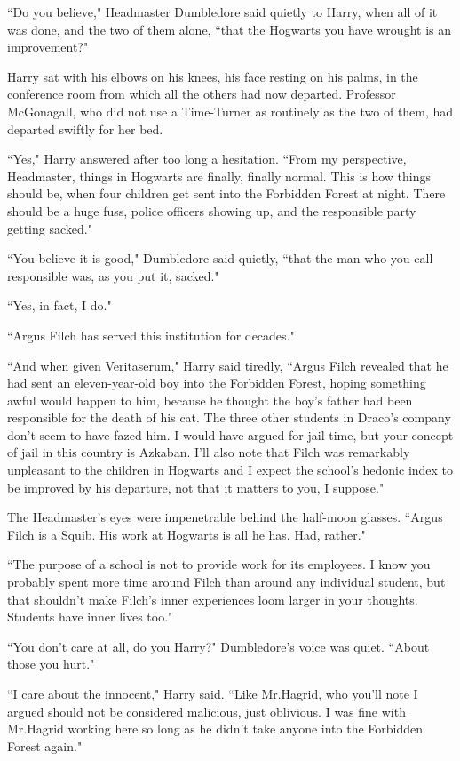 ``Do you believe," Headmaster Dumbledore said quietly to Harry, when all of it was done, and the two of them alone, ``that the Hogwarts you have wrought is an improvement?"

Harry sat with his elbows on his knees, his face resting on his palms, in the conference room from which all the others had now departed. Professor McGonagall, who did not use a Time-Turner as routinely as the two of them, had departed swiftly for her bed.

``Yes," Harry answered after too long a hesitation. ``From my perspective, Headmaster, things in Hogwarts are finally, finally normal. This is how things should be, when four children get sent into the Forbidden Forest at night. There should be a huge fuss, police officers showing up, and the responsible party getting sacked."

``You believe it is good," Dumbledore said quietly, ``that the man who you call responsible was, as you put it, sacked."

``Yes, in fact, I do."

``Argus Filch has served this institution for decades."

``And when given Veritaserum," Harry said tiredly, ``Argus Filch revealed that he had sent an eleven-year-old boy into the Forbidden Forest, hoping something awful would happen to him, because he thought the boy's father had been responsible for the death of his cat. The three other students in Draco's company don't seem to have fazed him. I would have argued for jail time, but your concept of jail in this country is Azkaban. I'll also note that Filch was remarkably unpleasant to the children in Hogwarts and I expect the school's hedonic index to be improved by his departure, not that it matters to you, I suppose."

The Headmaster's eyes were impenetrable behind the half-moon glasses. ``Argus Filch is a Squib. His work at Hogwarts is all he has. Had, rather."

``The purpose of a school is not to provide work for its employees. I know you probably spent more time around Filch than around any individual student, but that shouldn't make Filch's inner experiences loom larger in your thoughts. Students have inner lives too."

``You don't care at all, do you Harry?" Dumbledore's voice was quiet. ``About those you hurt."

``I care about the innocent," Harry said. ``Like Mr.\?Hagrid, who you'll note I argued should not be considered malicious, just oblivious. I was fine with Mr.\?Hagrid working here so long as he didn't take anyone into the Forbidden Forest again."

